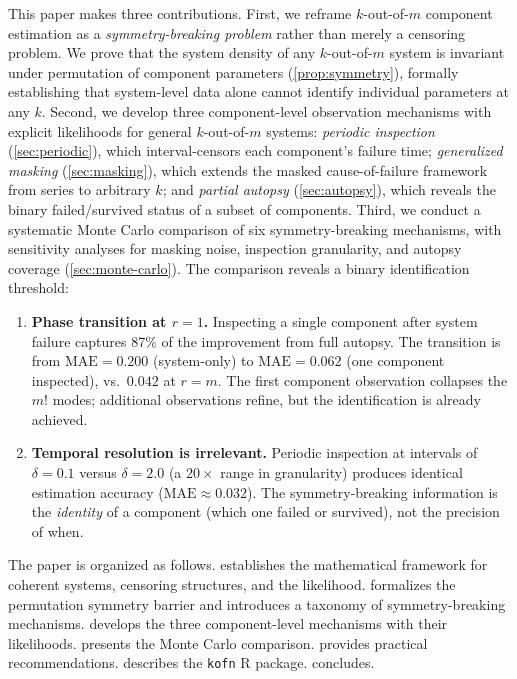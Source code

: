 \documentclass[12pt]{article}
\newcommand{\MAE}{\mathrm{MAE}}
\begin{document}
This paper makes three contributions.
%
First, we reframe $k$-out-of-$m$ component estimation as a
\emph{symmetry-breaking problem} rather than merely a censoring problem.
We prove that the system density of any $k$-out-of-$m$ system is invariant
under permutation of component parameters (\cref{prop:symmetry}), formally
establishing that system-level data alone cannot identify individual
parameters at any $k$.
%
Second, we develop three component-level observation mechanisms with explicit
likelihoods for general $k$-out-of-$m$ systems:
\emph{periodic inspection} (\cref{sec:periodic}), which interval-censors
each component's failure time;
\emph{generalized masking} (\cref{sec:masking}), which extends the masked
cause-of-failure framework from series to arbitrary $k$; and
\emph{partial autopsy} (\cref{sec:autopsy}), which reveals the binary
failed/survived status of a subset of components.
%
Third, we conduct a systematic Monte Carlo comparison of six
symmetry-breaking mechanisms, with sensitivity analyses for masking noise,
inspection granularity, and autopsy coverage (\cref{sec:monte-carlo}).
The comparison reveals a binary identification threshold:
\begin{enumerate}
  \item \textbf{Phase transition at $r=1$.}  Inspecting a single component
    after system failure captures 87\% of the improvement from full autopsy.
    The transition is from $\MAE = 0.200$ (system-only) to $\MAE = 0.062$
    (one component inspected), vs.\ $0.042$ at $r = m$.  The first
    component observation collapses the $m!$ modes; additional observations
    refine, but the identification is already achieved.
  \item \textbf{Temporal resolution is irrelevant.}  Periodic inspection at
    intervals of $\delta = 0.1$ versus $\delta = 2.0$ (a $20\times$ range
    in granularity) produces identical estimation accuracy
    ($\MAE \approx 0.032$).  The symmetry-breaking information is the
    \emph{identity} of a component (which one failed or survived), not
    the precision of when.
\end{enumerate}

The paper is organized as follows.   establishes the
mathematical framework for coherent systems, censoring structures, and the
likelihood.   formalizes the permutation symmetry barrier
and introduces a taxonomy of symmetry-breaking mechanisms.
 develops the three component-level mechanisms with
their likelihoods.   presents the Monte Carlo
comparison.   provides practical recommendations.
 describes the \texttt{kofn} R package.
 concludes.
\end{document}
